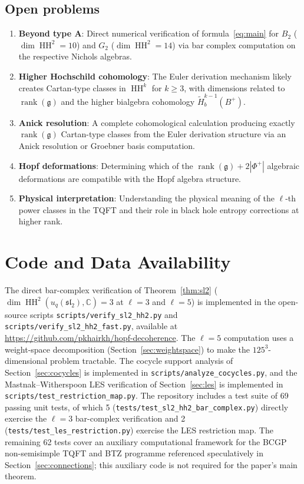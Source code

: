 \documentclass[11pt,letterpaper]{amsart}
\theoremstyle{plain}
\theoremstyle{definition}
\theoremstyle{remark}
\newcommand{\HH}{\operatorname{HH}}
\newcommand{\CC}{\mathbb{C}}
\begin{document}
\subsection{Open problems}

\begin{enumerate}
\item \textbf{Beyond type A}: Direct numerical verification of formula~\eqref{eq:main} for $B_2$ ($\dim \HH^2 = 10$) and $G_2$ ($\dim \HH^2 = 14$) via bar complex computation on the respective Nichols algebras.
\item \textbf{Higher Hochschild cohomology}: The Euler derivation mechanism likely creates Cartan-type classes in $\HH^k$ for $k \geq 3$, with dimensions related to $\operatorname{rank}(\mathfrak{g})$ and the higher bialgebra cohomology $\tilde{H}^{k-1}_b(B^+)$.
\item \textbf{Anick resolution}: A complete cohomological calculation producing exactly $\operatorname{rank}(\mathfrak{g})$ Cartan-type classes from the Euler derivation structure via an Anick resolution or Groebner basis computation.
\item \textbf{Hopf deformations}: Determining which of the $\operatorname{rank}(\mathfrak{g}) + 2|\Phi^+|$ algebraic deformations are compatible with the Hopf algebra structure.
\item \textbf{Physical interpretation}: Understanding the physical meaning of the $\ell$-th power classes in the TQFT and their role in black hole entropy corrections at higher rank.
\end{enumerate}

\section*{Code and Data Availability}
\label{sec:code}

The direct bar-complex verification of Theorem~\ref{thm:sl2} ($\dim\HH^2(u_q(\mathfrak{sl}_2), \CC) = 3$ at $\ell = 3$ and $\ell = 5$) is implemented in the open-source scripts \texttt{scripts/verify\_sl2\_hh2.py} and \texttt{scripts/verify\_sl2\_hh2\_fast.py}, available at \url{https://github.com/pkhairkh/hopf-decoherence}. The $\ell = 5$ computation uses a weight-space decomposition (Section~\ref{sec:weightspace}) to make the $125^3$-dimensional problem tractable. The cocycle support analysis of Section~\ref{sec:cocycles} is implemented in \texttt{scripts/analyze\_cocycles.py}, and the Mastnak--Witherspoon LES verification of Section~\ref{sec:les} is implemented in \texttt{scripts/test\_restriction\_map.py}. The repository includes a test suite of 69 passing unit tests, of which 5 (\texttt{tests/test\_sl2\_hh2\_bar\_complex.py}) directly exercise the $\ell = 3$ bar-complex verification and 2 (\texttt{tests/test\_les\_restriction.py}) exercise the LES restriction map. The remaining 62 tests cover an auxiliary computational framework for the BCGP non-semisimple TQFT and BTZ programme referenced speculatively in Section~\ref{sec:connections}; this auxiliary code is not required for the paper's main theorem.
\end{document}
